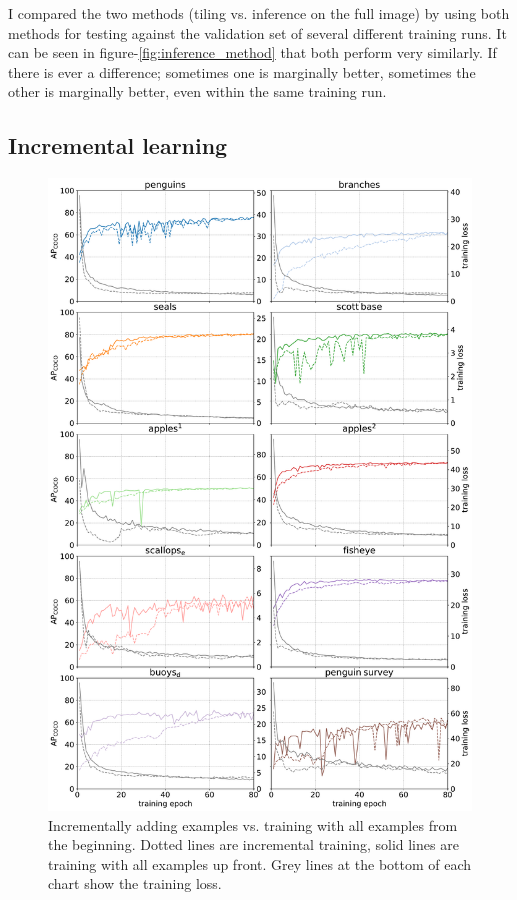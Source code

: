 I compared the two methods (tiling vs. inference on the full image) by using both methods for testing against the validation set of several different training runs. It can be seen in figure-\ref{fig:inference_method} that both perform very similarly. If there is ever a difference; sometimes one is marginally better, sometimes the other is marginally better, even within the same training run.

\subsection{Incremental learning}
\label{sec:lr_schedule_exp}

\begin{figure}[H]
  \centering
  \includegraphics[width=0.9\linewidth]{charts/training/incremental.pdf}
  \caption{Incrementally adding examples vs. training with all examples from the beginning. Dotted lines are incremental training, solid lines are training with all examples up front. Grey lines at the bottom of each chart show the training loss.}  
  \label{fig:incremental}
\end{figure}

